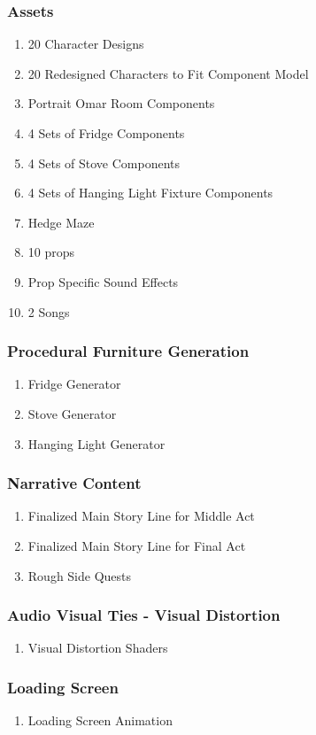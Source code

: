 \subsubsection{Assets}
\begin{enumerate}
\item 20 Character Designs
\item 20 Redesigned Characters to Fit Component Model
\item Portrait Omar Room Components
\item 4 Sets of Fridge Components
\item 4 Sets of Stove Components
\item 4 Sets of Hanging Light Fixture Components
\item Hedge Maze
\item 10 props
\item Prop Specific Sound Effects
\item 2 Songs
\end{enumerate}
\subsubsection{Procedural Furniture Generation}
\begin{enumerate}
\item Fridge Generator
\item Stove Generator
\item Hanging Light Generator
\end{enumerate}
\subsubsection{Narrative Content}
\begin{enumerate}
\item Finalized Main Story Line for Middle Act
\item Finalized Main Story Line for Final Act
\item Rough Side Quests
\end{enumerate}
\subsubsection{Audio Visual Ties - Visual Distortion}
\begin{enumerate}
\item Visual Distortion Shaders
\end{enumerate}
\subsubsection{Loading Screen}
\begin{enumerate}
\item Loading Screen Animation
\end{enumerate}
